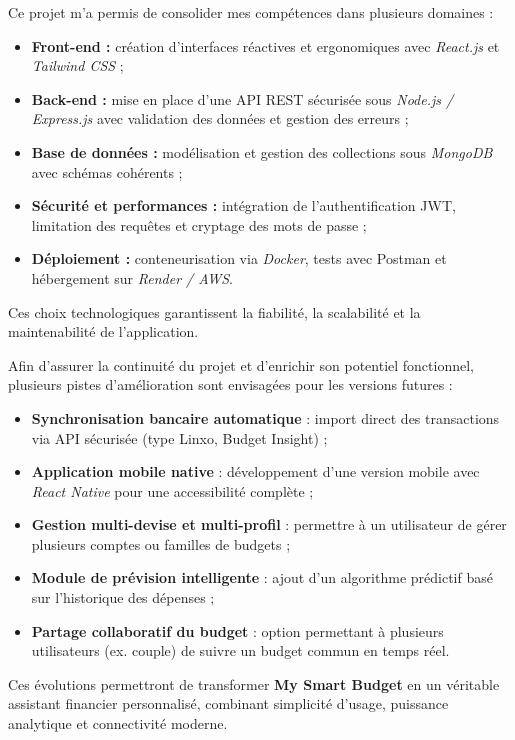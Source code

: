 \begin{tcolorbox}[colback=blue!5!white,colframe=blue!60!black,title=\textbf{Enjeux techniques et fonctionnels maîtrisés}]
Ce projet m’a permis de consolider mes compétences dans plusieurs domaines :
\begin{itemize}
    \item \textbf{Front-end :} création d’interfaces réactives et ergonomiques avec \textit{React.js} et \textit{Tailwind CSS} ;
    \item \textbf{Back-end :} mise en place d’une API REST sécurisée sous \textit{Node.js / Express.js} avec validation des données et gestion des erreurs ;
    \item \textbf{Base de données :} modélisation et gestion des collections sous \textit{MongoDB} avec schémas cohérents ;
    \item \textbf{Sécurité et performances :} intégration de l’authentification JWT, limitation des requêtes et cryptage des mots de passe ;
    \item \textbf{Déploiement :} conteneurisation via \textit{Docker}, tests avec Postman et hébergement sur \textit{Render / AWS}.
\end{itemize}

Ces choix technologiques garantissent la fiabilité, la scalabilité et la maintenabilité de l’application.
\end{tcolorbox}

\begin{tcolorbox}[colback=green!5!white,colframe=green!60!black,title=\textbf{Perspectives d’évolution}]
Afin d’assurer la continuité du projet et d’enrichir son potentiel fonctionnel, plusieurs pistes d’amélioration sont envisagées pour les versions futures :
\begin{itemize}
    \item \textbf{Synchronisation bancaire automatique} : import direct des transactions via API sécurisée (type Linxo, Budget Insight) ;
    \item \textbf{Application mobile native} : développement d’une version mobile avec \textit{React Native} pour une accessibilité complète ;
    \item \textbf{Gestion multi-devise et multi-profil} : permettre à un utilisateur de gérer plusieurs comptes ou familles de budgets ;
    \item \textbf{Module de prévision intelligente} : ajout d’un algorithme prédictif basé sur l’historique des dépenses ;
    \item \textbf{Partage collaboratif du budget} : option permettant à plusieurs utilisateurs (ex. couple) de suivre un budget commun en temps réel.
\end{itemize}

Ces évolutions permettront de transformer \textbf{My Smart Budget} en un véritable assistant financier personnalisé, combinant simplicité d’usage, puissance analytique et connectivité moderne.
\end{tcolorbox}

